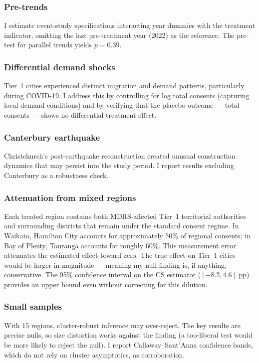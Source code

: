 \documentclass[12pt]{article}
\begin{document}
\subsubsection*{Pre-trends} I estimate event-study specifications interacting year dummies with the treatment indicator, omitting the last pre-treatment year (2022) as the reference. The pre-test for parallel trends yields $p = 0.39$.

\subsubsection*{Differential demand shocks} Tier~1 cities experienced distinct migration and demand patterns, particularly during COVID-19. I address this by controlling for log total consents (capturing local demand conditions) and by verifying that the placebo outcome --- total consents --- shows no differential treatment effect.

\subsubsection*{Canterbury earthquake} Christchurch's post-earthquake reconstruction created unusual construction dynamics that may persist into the study period. I report results excluding Canterbury as a robustness check.

\subsubsection*{Attenuation from mixed regions} Each treated region contains both MDRS-affected Tier~1 territorial authorities and surrounding districts that remain under the standard consent regime. In Waikato, Hamilton City accounts for approximately 50\% of regional consents; in Bay of Plenty, Tauranga accounts for roughly 60\%. This measurement error attenuates the estimated effect toward zero. The true effect on Tier~1 cities would be larger in magnitude --- meaning my null finding is, if anything, conservative. The 95\% confidence interval on the CS estimator ($[-8.2, 4.6]$ pp) provides an upper bound even without correcting for this dilution.

\subsubsection*{Small samples} With 15 regions, cluster-robust inference may over-reject. The key results are precise nulls, so size distortion works against the finding (a too-liberal test would be more likely to reject the null). I report Callaway--Sant'Anna confidence bands, which do not rely on cluster asymptotics, as corroboration.
\end{document}
